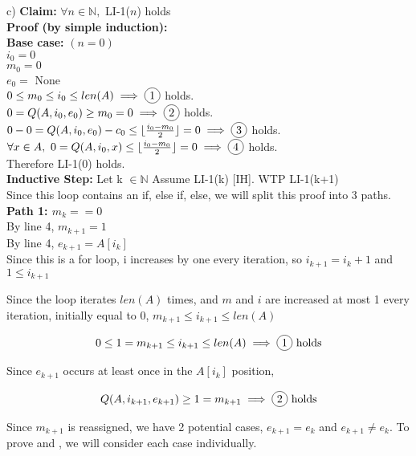 \documentclass{article}
\newcommand{\floor}[1]{\lfloor #1 \rfloor}
\newcommand{\N}{\mathbb{N}}
\DeclareRobustCommand*\circled[1]{\tikz[baseline =(char.base)]{\node[shape=circle, draw, inner sep = 2pt] (char) {#1};}}
\begin{document}
\begin{enumerate}
	c) \textbf{Claim:} $\forall n \in \N,$ LI-1($n$) holds\\
	
	\textbf{Proof (by simple induction):}\\
	
	\textbf{Base case:} $(n = 0)$\\
	$i_0 = 0$\\
	$m_0 = 0$\\
	$e_0 =$ None\\
	
	$0 \leq m_0 \leq i_0 \leq len(A) \implies \circled{1}$ holds.\\
	$0 = Q(A, i_0, e_0) \geq m_0 = 0 \implies \circled{2}$ holds.\\
	$0 - 0 = Q(A, i_0, e_0) - c_0 \leq \floor{\frac{i_0 - m_0}{2}} = 0 \implies \circled{3}$ holds.\\
	$\forall x \in A,\ 0 = Q(A, i_0, x) \leq \floor{\frac{i_0 -  m_0}{2}} = 0 \implies \circled{4}$ holds.\\
	
	Therefore LI-1(0) holds.\\
	
	\textbf{Inductive Step:} Let k $\in \N$ Assume LI-1(k) [IH]. WTP LI-1(k+1)\\
	Since this loop contains an if, else if, else, we will split this proof into 3 paths. \\
	
	\textbf{Path 1: $m_k == 0$}\\
	By line 4, $m_{k+1} = 1$\\
	By line 4, $e_{k+1} = A[i_k]$\\
	Since this is a for loop, i increases by one every iteration, so $i_{k+1} = i_k +1$ and $1 \leq i_{k+1}$
	
	Since the loop iterates $len(A)$ times, and $m$ and $i$ are increased at most 1 every iteration, initially equal to 0, $m_{k+1} \leq i_{k+1} \leq len(A) $
	
	$$0 \leq 1 = m_{k+1} \leq i_{k+1} \leq len(A) \implies \circled{1} \text{ holds}$$
	
	Since $e_{k+1}$ occurs at least once in the $A[i_k]$ position,
	
	$$Q(A, i_{k+1}, e_{k+1}) \geq 1 = m_{k+1} \implies \circled{2} \text{ holds}$$
	
	Since $m_{k+1}$ is reassigned, we have 2 potential cases, $e_{k+1} = e_k$ and $e_{k+1} \neq e_k$. To prove  \circled{3} and \circled{4}, we will consider each case individually. \\ 
	

\end{enumerate}
\end{document}
